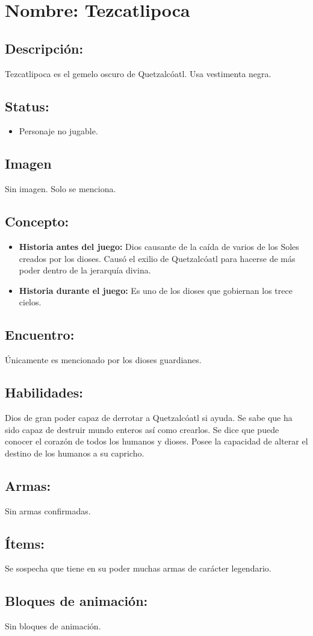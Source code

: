 \section{Nombre: Tezcatlipoca}  \label{per:tezcatlipoca}
\subsection{Descripción:}
Tezcatlipoca es el gemelo oscuro de Quetzalcóatl. Usa vestimenta negra. 
\subsection{Status:}
\begin{itemize}
		\item Personaje no jugable.
	\end{itemize}
\subsection{Imagen}
Sin imagen. Solo se menciona.
\subsection{Concepto:}
\begin{itemize}
	\item \textbf{Historia antes del juego:}
	Dios causante de la caída de varios de los Soles creados por los dioses. Causó el exilio de Quetzalcóatl para hacerse de más poder dentro de la jerarquía divina. 
	\item \textbf{Historia durante el juego:}
	Es uno de los dioses que gobiernan los trece cielos.
\end{itemize} 
\subsection{Encuentro:}
Únicamente es mencionado por los dioses guardianes.
\subsection{Habilidades:}
Dios de gran poder capaz de derrotar a Quetzalcóatl si ayuda. Se sabe que ha sido capaz de destruir mundo enteros así como crearlos. Se dice que puede conocer el corazón de todos los humanos y dioses. Posee la capacidad de alterar el destino de los humanos a su capricho.
\subsection{Armas:}
Sin armas confirmadas.
\subsection{Ítems:}
Se sospecha que tiene en su poder muchas armas de carácter legendario.
\subsection{Bloques de animación:}
Sin bloques de animación.